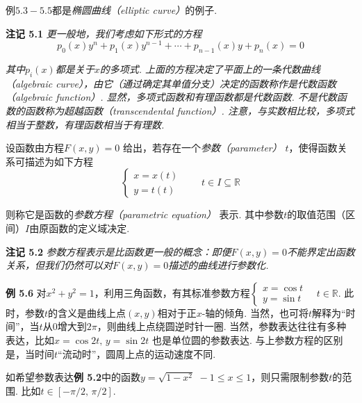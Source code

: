\documentclass{article}
\begin{document}
例$5.3-5.5$都是\textit{椭圆曲线（elliptic curve）}的例子. 

\vspace{3pt}

\textbf{注记 5.1} \textit{更一般地，我们考虑如下形式的方程}\[p_{0}(x)y^{n}+p_{1}(x)y^{n-1}+\cdots+p_{n-1}(x)y+p_{n}(x)=0\]

\textit{其中$p_{i}(x)$都是关于$x$的多项式. 上面的方程决定了平面上的一条\textit{代数曲线（algebraic curve）}，由它（通过确定其单值分支）决定的函数称作是\textit{代数函数（algebraic function）}. 显然，多项式函数和有理函数都是代数函数. 不是代数函数的函数称为\textit{超越函数（transcendental function）}. 注意，与实数相比较，多项式相当于整数，有理函数相当于有理数.} 


\vspace{4pt}

设函数由方程$F(x,y)=0$ 给出，若存在一个\textit{参数（parameter）} $t$，使得函数关系可描述为如下方程\[\left\{\begin{array}{c}
     x=x(t)  \\
     y=t(t)
\end{array}\right.\qquad t\in I\subseteq \mathbb{R}\]

则称它是函数的\textit{参数方程（parametric equation）} 表示. 其中参数$t$的取值范围（区间）$I$由原函数的定义域决定. 

\vspace{3pt}

\textbf{注记 5.2} \textit{参数方程表示是比函数更一般的概念：即便$F(x,y)=0$不能界定出函数关系，但我们仍然可以对$F(x,y)=0$描述的曲线进行参数化. }

\vspace{3pt}

\textbf{例 5.6} 对$x^{2}+y^{2}=1$，利用三角函数，有其标准参数方程$\left\{\begin{array}{c}
     x=\cos{t}\\
     y=\sin{t} 
\end{array}\right.\quad t\in \mathbb{R}$. 此时，参数$t$的含义是曲线上点$(x,y)$相对于正$x$-轴的倾角. 当然，也可将$t$解释为“时间”，当$t$从$0$增大到$2\pi$，则曲线上点绕圆逆时针一圈. 当然，参数表达往往有多种表达，比如$x=\cos{2t},\,y=\sin{2t}$ 也是单位圆的参数表达. 与上参数方程的区别是，当时间$t$“流动时”，圆周上点的运动速度不同. 

\vspace{3pt}

如希望参数表达\textbf{例 5.2}中的函数$y=\sqrt{1-x^{2}}\,\,-1\leq x\leq 1$，则只需限制参数$t$的范围. 比如$t\in [-\pi/2,\,\pi/2]$. 
\end{document}
